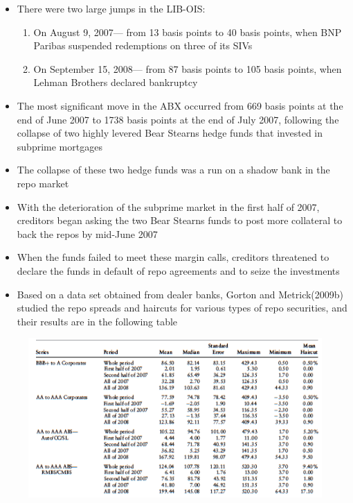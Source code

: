 \documentclass[11pt]{beamer}
\begin{document}
\begin{frame}
\begin{itemize}
\item There were two large jumps in the LIB-OIS:
\begin{enumerate}
\item On August 9, 2007— from 13 basis points to 40 basis points, when BNP Paribas suspended redemptions on three of its SIVs
\item On September 15, 2008— from 87 basis points to 105 basis points, when Lehman Brothers declared bankruptcy
\end{enumerate}
\item The most significant move in the ABX occurred from 669 basis points at the end of June 2007 to 1738 basis points at the end of July 2007, following the collapse of two highly levered Bear Stearns hedge funds that invested in subprime mortgages
\item The collapse of these two hedge funds was a run on a shadow bank in the repo market
\item With the deterioration of the subprime market in the first half of 2007, creditors began asking the two Bear Stearns funds to post more collateral to back the repos by mid-June 2007
\end{itemize}
\end{frame}

\begin{frame}
\begin{itemize}
\item When the funds failed to meet these margin calls, creditors threatened to declare the funds in default of repo agreements and to seize the investments
\item Based on a data set obtained from dealer banks, Gorton and Metrick(2009b) studied the repo spreads and haircuts for various types of repo securities, and their results are in the following table
\end{itemize}
\end{frame}

\begin{frame}
\begin{figure}
\includegraphics[width=\textwidth]{11_10.png}
\end{figure}
\end{frame}
\end{document}

